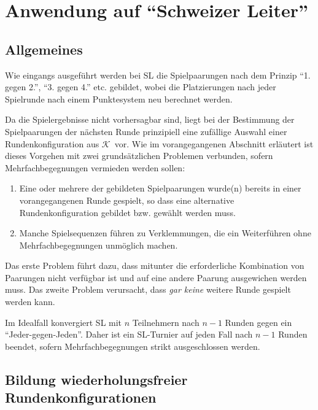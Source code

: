\documentclass[DIV=15, 10pt]{scrartcl}
\newcommand{\KSet}{$\mathcal{K}$}
\begin{document}
\section{Anwendung auf "`Schweizer Leiter"'}
\label{laSchweizerLeiterMain}

\subsection{Allgemeines}

Wie eingangs ausgeführt werden bei SL die Spielpaarungen nach dem Prinzip "`1. gegen 2."', "`3. gegen 4."' etc. gebildet, wobei die Platzierungen nach jeder Spielrunde nach einem Punktesystem neu berechnet werden.

Da die Spielergebnisse nicht vorhersagbar sind, liegt bei der Bestimmung der Spielpaarungen der nächsten Runde prinzipiell eine zufällige Auswahl einer Rundenkonfiguration aus \KSet\ vor. Wie im vorangegangenen Abschnitt erläutert ist dieses Vorgehen mit zwei grundsätzlichen Problemen verbunden, sofern Mehrfachbegegnungen vermieden werden sollen:

\begin{enumerate}

\item Eine oder mehrere der gebildeten Spielpaarungen wurde(n) bereits in einer vorangegangenen Runde gespielt, so dass eine alternative Rundenkonfiguration gebildet bzw. gewählt werden muss.

\item Manche Spielsequenzen führen zu Verklemmungen, die ein Weiterführen ohne Mehrfachbegegnungen unmöglich machen.

\end{enumerate}

Das erste Problem führt dazu, dass mitunter die erforderliche Kombination von Paarungen nicht verfügbar ist und auf eine andere Paarung ausgewichen werden muss. Das zweite Problem verursacht, dass \emph{gar keine} weitere Runde gespielt werden kann.

Im Idealfall konvergiert SL mit $n$ Teilnehmern nach $n-1$ Runden gegen ein "`Jeder-gegen-Jeden"'. Daher ist ein SL-Turnier auf jeden Fall nach $n-1$ Runden beendet, sofern Mehrfachbegegnungen strikt ausgeschlossen werden.

\subsection{Bildung wiederholungsfreier Rundenkonfigurationen}
\label{laAlgoSL}
\end{document}
